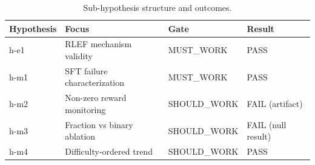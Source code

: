 \begin{table}[h]
\centering
\caption{Sub-hypothesis structure and outcomes.}
\label{tab:hypotheses}
\begin{tabular}{llll}
\toprule
\textbf{Hypothesis} & \textbf{Focus} & \textbf{Gate} & \textbf{Result} \\
\midrule
h-e1 & RLEF mechanism validity & MUST\_WORK & PASS \\
h-m1 & SFT failure characterization & MUST\_WORK & PASS \\
h-m2 & Non-zero reward monitoring & SHOULD\_WORK & FAIL (artifact) \\
h-m3 & Fraction vs binary ablation & SHOULD\_WORK & FAIL (null result) \\
h-m4 & Difficulty-ordered trend & SHOULD\_WORK & PASS \\
\bottomrule
\end{tabular}
\end{table}
